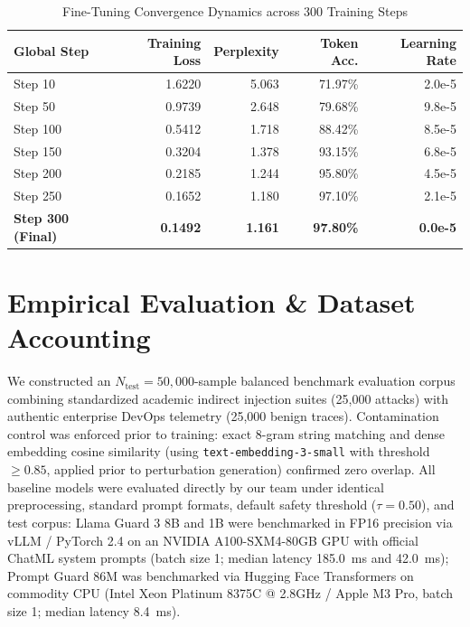 \documentclass[10pt,journal,compsoc]{IEEEtran}
\begin{document}
\begin{table}[t]
\centering
\caption{Fine-Tuning Convergence Dynamics across 300 Training Steps}
\begin{tabular}{lrrrr}
\toprule
\textbf{Global Step} & \textbf{Training Loss} & \textbf{Perplexity} & \textbf{Token Acc.} & \textbf{Learning Rate} \\
\midrule
Step 10 & 1.6220 & 5.063 & 71.97\% & 2.0e-5 \\
Step 50 & 0.9739 & 2.648 & 79.68\% & 9.8e-5 \\
Step 100 & 0.5412 & 1.718 & 88.42\% & 8.5e-5 \\
Step 150 & 0.3204 & 1.378 & 93.15\% & 6.8e-5 \\
Step 200 & 0.2185 & 1.244 & 95.80\% & 4.5e-5 \\
Step 250 & 0.1652 & 1.180 & 97.10\% & 2.1e-5 \\
\textbf{Step 300 (Final)} & \textbf{0.1492} & \textbf{1.161} & \textbf{97.80\%} & \textbf{0.0e-5} \\
\bottomrule
\end{tabular}
\end{table}

\section{Empirical Evaluation \& Dataset Accounting}
We constructed an $N_{\text{test}} = 50,000$-sample balanced benchmark evaluation corpus combining standardized academic indirect injection suites (25,000 attacks) with authentic enterprise DevOps telemetry (25,000 benign traces). Contamination control was enforced prior to training: exact 8-gram string matching and dense embedding cosine similarity (using \texttt{text-embedding-3-small} with threshold $\ge 0.85$, applied prior to perturbation generation) confirmed zero overlap. All baseline models were evaluated directly by our team under identical preprocessing, standard prompt formats, default safety threshold ($\tau = 0.50$), and test corpus: Llama Guard 3 8B and 1B were benchmarked in FP16 precision via vLLM / PyTorch 2.4 on an NVIDIA A100-SXM4-80GB GPU with official ChatML system prompts (batch size 1; median latency 185.0~ms and 42.0~ms); Prompt Guard 86M was benchmarked via Hugging Face Transformers on commodity CPU (Intel Xeon Platinum 8375C @ 2.8GHz / Apple M3 Pro, batch size 1; median latency 8.4~ms).
\end{document}
